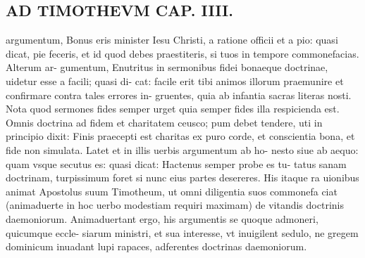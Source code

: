 \documentclass{article}
\begin{document}
\begin{pages}
\section*{AD TIMOTHEVM CAP. IIII. }
\marginpar{[ p.95 ]}\pstart argumentum, Bonus eris minister Iesu Christi, a ratione officii et a pio: quasi dicat, pie feceris, et id quod debes praestiteris, si tuos in tempore commonefacias. Alterum ar- gumentum, Enutritus in sermonibus fidei bonaeque doctrinae, uidetur esse a facili; quasi di- cat: facile erit tibi animos illorum praemunire et confirmare contra tales errores in- gruentes, quia ab infantia sacras literas nosti. Nota quod sermones fides semper urget quia semper fides illa respicienda est. Omnis doctrina ad fidem et charitatem ceusco; pum debet tendere, uti in principio dixit: Finis praecepti est charitas ex puro corde, et conscientia bona, et fide non simulata. Latet et in illis uerbis argumentum ab ho- nesto siue ab aequo: quam vsque secutus es: quasi dicat: Hactenus semper probe es tu- tatus sanam doctrinam, turpissimum foret si nunc eius partes desereres. His itaque ra uionibus animat Apostolus suum Timotheum, ut omni diligentia suos commonefa ciat (animaduerte in hoc uerbo modestiam requiri maximam) de vitandis doctrinis daemoniorum. Animaduertant ergo, his argumentis se quoque admoneri, quicumque eccle- siarum ministri, et sua interesse, vt inuigilent sedulo, ne gregem dominicum inuadant lupi rapaces, adferentes doctrinas daemoniorum.  \pend
{}
{}

\end{pages}
\end{document}
